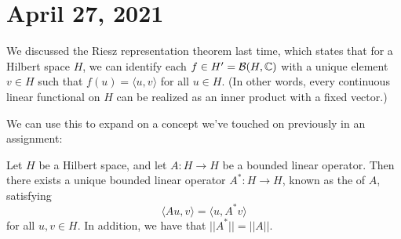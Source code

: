 \pagebreak\section*{April 27, 2021}

We discussed the Riesz representation theorem last time, which states that for a Hilbert space $H$, we can identify each $f \in H' = \mathcal{B}(H, \mathbb C)$ with a unique element $v \in H$ such that $f(u) = \langle u, v \rangle$ for all $u \in H$. (In other words, every continuous linear functional on $H$ can be realized as an inner product with a fixed vector.) 

We can use this to expand on a concept we've touched on previously in an assignment:

\begin{theorem}
Let $H$ be a Hilbert space, and let $A: H \to H$ be a bounded linear operator. Then there exists a unique bounded linear operator $A^\ast: H \to H$, known as the  of $A$, satisfying 
\[
    \langle Au, v \rangle = \langle u, A^\ast v \rangle
\]
for all $u, v \in H$. In addition, we have that $||A^\ast|| = ||A||$.
\end{theorem}
